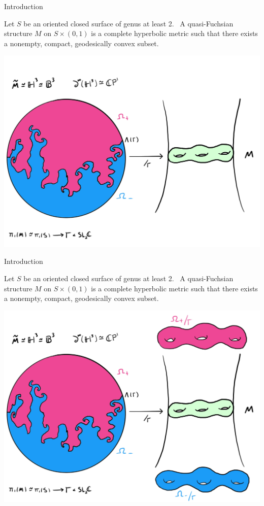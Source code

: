 \documentclass[professionalfont]{beamer}
\begin{document}



\begin{frame}{Introduction}

Let $S$ be an oriented closed surface of genus at least 2.  \ A quasi-Fuchsian structure $M$ on $S \times (0,1)$ is a complete hyperbolic metric such that there exists a nonempty, compact, geodesically convex subset.


\centering\includegraphics[scale=0.09]{QF-7.jpg}
	


\end{frame}






\begin{frame}{Introduction}

Let $S$ be an oriented closed surface of genus at least 2.  \ A quasi-Fuchsian structure $M$ on $S \times (0,1)$ is a complete hyperbolic metric such that there exists a nonempty, compact, geodesically convex subset.


\centering\includegraphics[scale=0.09]{QF-8.jpg}
	


\end{frame}
\end{document}
